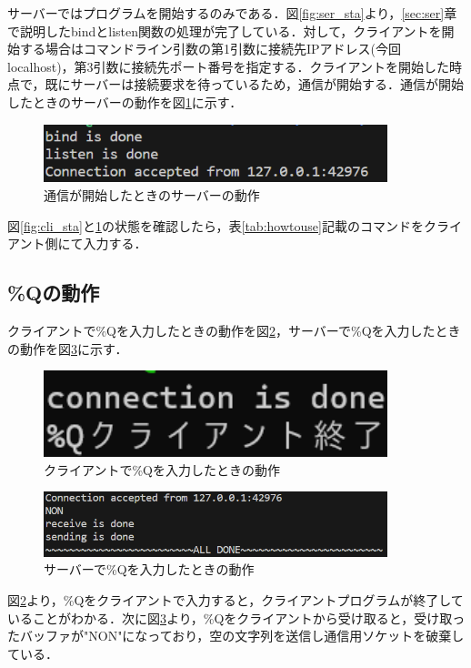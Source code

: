 \documentclass[11pt,a4j,titlepage]{jsarticle}
\begin{document}
サーバーではプログラムを開始するのみである．図\ref{fig:ser_sta}より，\ref{sec:ser}章で説明したbindとlisten関数の処理が完了している．対して，クライアントを開始する場合はコマンドライン引数の第1引数に接続先IPアドレス(今回localhost)，第3引数に接続先ポート番号を指定する．クライアントを開始した時点で，既にサーバーは接続要求を待っているため，通信が開始する．通信が開始したときのサーバーの動作を図\ref{fig:ser_conesta}に示す．
\begin{figure}[h]
\centering
\includegraphics[width=10cm]{pics/server_connected.png}
\caption{通信が開始したときのサーバーの動作}
\label{fig:ser_conesta}\vspace{0zh}
\end{figure}

図\ref{fig:cli_sta}と\ref{fig:ser_conesta}の状態を確認したら，表\ref{tab:howtouse}記載のコマンドをクライアント側にて入力する．
\subsection{\%Qの動作}
クライアントで\%Qを入力したときの動作を図\ref{fig:Q_cli}，サーバーで\%Qを入力したときの動作を図\ref{fig:Q_ser}に示す．
\begin{figure}[]
\centering
\includegraphics[width=10cm]{pics/Q_client.png}
\caption{クライアントで\%Qを入力したときの動作}
\label{fig:Q_cli}\vspace{0zh}
\end{figure}
\begin{figure}[tbp]
\centering
\includegraphics[width=10cm]{pics/Q_server.png}
\caption{サーバーで\%Qを入力したときの動作}
\label{fig:Q_ser}\vspace{0zh}
\end{figure}

図\ref{fig:Q_cli}より，\%Qをクライアントで入力すると，クライアントプログラムが終了していることがわかる．次に図\ref{fig:Q_ser}より，\%Qをクライアントから受け取ると，受け取ったバッファが"NON"になっており，空の文字列を送信し通信用ソケットを破棄している．
\end{document}
